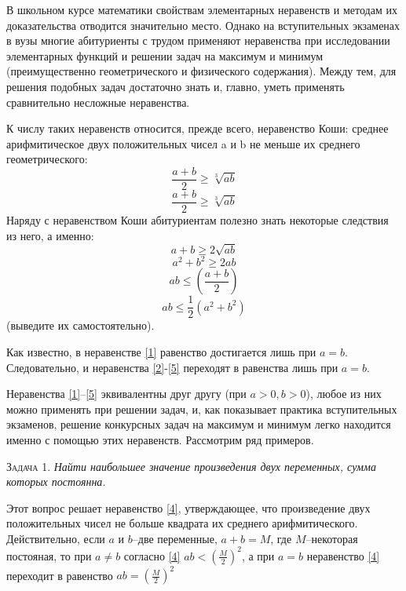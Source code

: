 \newpage
\setlength{\columnsep}{50pt}
\begin{multicols}{2}
\setcounter{page}{37}
В школьном курсе математики свойствам элементарных неравенств и методам их доказательства отводится значительно место. Однако на вступительных экзаменах в вузы многие абитуриенты с трудом применяют неравенства при исследовании элементарных функций и решении задач на максимум и минимум (преимущественно геометрического и физического содержания). Между тем, для решения подобных задач достаточно знать и, главно, уметь применять сравнительно несложные неравенства.\par 
К числу таких неравенств относится, прежде всего, неравенство Коши: среднее арифмитическое двух положительных чисел a и b не меньше их среднего геометрического:
\begin{equation}\label{(1)}
    \frac{a+b}{2}\geq\sqrt[3]{ab}
\end{equation}
\[ \frac{a+b}{2}\geq\sqrt[3]{ab}\]
Наряду с неравенством Коши абитуриентам полезно знать некоторые следствия из него, а именно:
\begin{equation}
    a+b\geq2\sqrt{ab}
\end{equation}
\begin{equation}\label{(3)}
   a^2+b^2\geq2ab
\end{equation}
\begin{equation}\label{(4)}
    ab\leq(\frac{a+b}{2})
\end{equation}
\begin{equation}\label{(5)}
    ab\leq\frac{1}{2}(a^2+b^2)
\end{equation}
(выведите их самостоятельно).\par
Как известно, в неравенстве \eqref{1} равенство достигается лишь при \(a=b\). Следовательно, и неравенства \eqref{2}-\eqref{5} переходят в равенства лишь при \(a=b\). 

Неравенства \eqref{1}--\eqref{5} эквивалентны друг другу (при \(a>0, b>0\)), любое из них можно применять при решении задач, и, как показывает практика вступительных экзаменов, решение конкурсных задач на максимум и минимум легко находится именно с помощью этих неравенств. Рассмотрим ряд примеров.

\textsc{Задача 1.} \textit{Найти наибольшее значение произведения двух переменных, сумма которых постоянна.}

Этот вопрос решает неравенство \eqref{4}, утверждающее, что произведение двух положительных чисел не больше квадрата их среднего арифмитического. Действительно, если \(a\) и \(b\)--две переменные, \(a+b=M\), где \(M\)--некоторая постояная, то при \(a \neq b\) согласно \eqref{4} \(ab<(\frac{M}{2})^2\), а при \(a=b\) неравенство \eqref{4} переходит в равенство \(ab=(\frac{M}{2})^2\)


\end{multicols}
